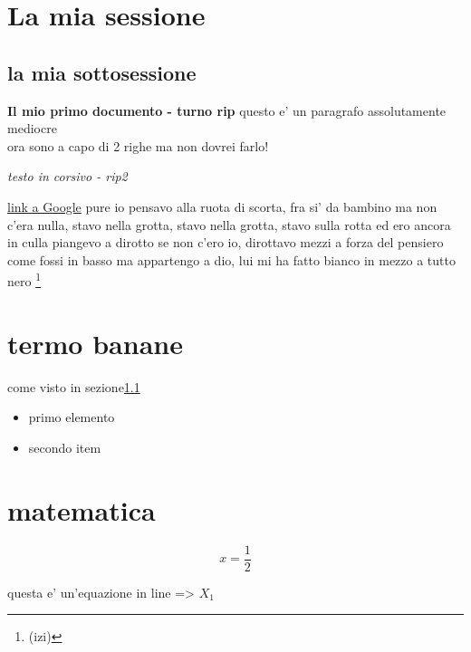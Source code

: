 \documentclass[]{article}
\begin{document}
\tableofcontents

\newpage

\section{La mia sessione}
\subsection{la mia sottosessione}\label{sec:banane}

\textbf{Il mio primo documento - turno rip}
 questo e' un paragrafo assolutamente mediocre\\[2ex]
ora sono a capo di 2 righe ma non dovrei farlo!

\textit{testo in corsivo - rip2}

\href{www.google.it}{link a Google}
pure io pensavo alla ruota di scorta, fra si' da bambino ma non c'era nulla, stavo nella grotta, stavo nella grotta, stavo sulla rotta ed ero ancora in culla
piangevo a dirotto se non c'ero io, dirottavo mezzi a forza del pensiero come fossi in basso ma appartengo a dio, lui mi ha fatto bianco in mezzo a tutto nero \footnote{(izi)}
\section{termo banane}
come visto in sezione\ref{sec:banane}

\begin{itemize}
    \item primo elemento
    \item secondo item
\end{itemize}

\section{matematica}
\begin{equation}
    x= \frac{1}{2} %
\end{equation}

questa e' un'equazione in line => $X_1$
\end{document}
